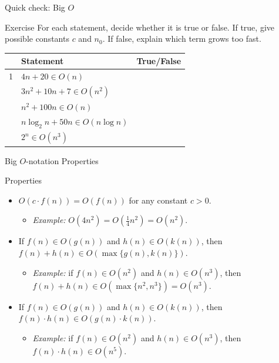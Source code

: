 \documentclass[aspectratio=169]{beamer}
\begin{document}
\begin{frame}{Quick check: Big $O$}
  \small
  \begin{block}{Exercise}
    For each statement, decide whether it is true or false. If true, give possible constants
    $c$ and $n_0$. If false, explain which term grows too fast.
  \end{block}
  \begin{center}
    \renewcommand{\arraystretch}{1.22}
    \begin{tabular}{c|L{0.62\textwidth}|c}
      \toprule
      & \textbf{Statement} & \textbf{True/False} \\
       & $4n+20\in O(n)$ & \\  & $3n^2+10n+7\in O(n^2)$ & \\  & $n^2+100n\in O(n)$ & \\  & $n\log_2 n+50n\in O(n\log n)$ & \\  & $2^n\in O(n^3)$ & \\
      \bottomrule
    \end{tabular}
  \end{center}
\end{frame}


\begin{frame}{Big $O$-notation Properties}
  \small
  \begin{block}{Properties}
       \begin{itemize}
            \item $O(c\cdot f(n))=O(f(n))$ for any constant $c>0$.
              \begin{itemize}
                \item[] \emph{Example:} $O(4n^2)=O(\frac{1}{4}n^2)=O(n^2)$.
              \end{itemize}
            \item If $f(n) \in O(g(n))$ and $h(n) \in O(k(n))$, then
            $f(n) + h(n)\in O(\max\{g(n), k(n)\})$.
              \begin{itemize}
                \item[] \emph{Example:} if $f(n) \in O(n^2)$ and $h(n) \in O(n^3)$, then
                $f(n) + h(n) \in O(\max\{n^2,n^3\}) = O(n^3)$.
              \end{itemize}
            \item If $f(n) \in O(g(n))$ and $h(n) \in O(k(n))$, then
            $f(n)\cdot h(n) \in O(g(n)\cdot k(n))$.
              \begin{itemize}
                \item[] \emph{Example:} if $f(n) \in O(n^2)$ and $h(n) \in O(n^3)$, then
                $f(n)\cdot h(n) \in O(n^5)$.
              \end{itemize}
        \end{itemize}
      \end{block}
\end{frame}
\end{document}
